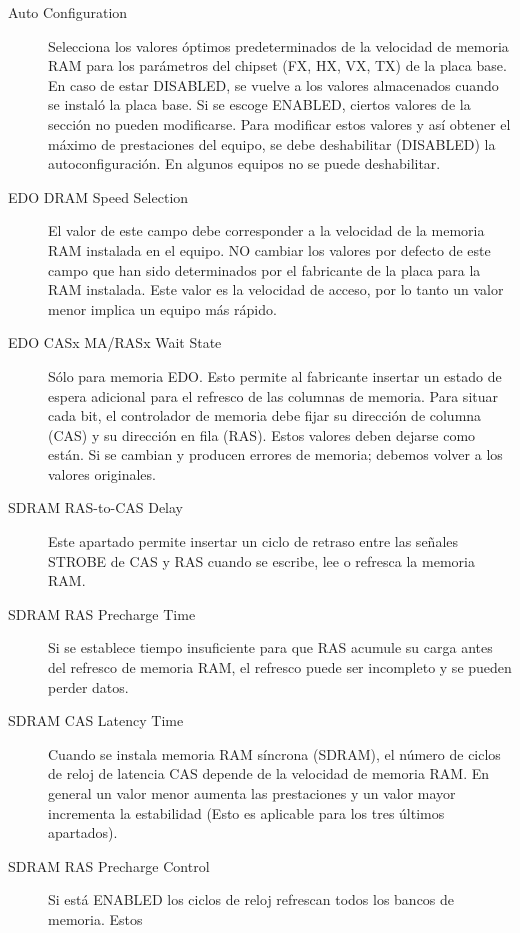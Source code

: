\documentclass[12pt,oneside,a4paper]{article}
\begin{document}
			\begin{description}
				\item[Auto Configuration] Selecciona los valores óptimos
					predeterminados de la velocidad de memoria RAM para los
					parámetros del chipset (FX, HX, VX, TX) de la placa base.
					En caso de estar DISABLED, se vuelve a los valores
					almacenados cuando se instaló la placa base. Si se escoge
					ENABLED, ciertos valores de la sección no pueden
					modificarse. Para modificar estos valores y así obtener el
					máximo de prestaciones del equipo, se debe deshabilitar
					(DISABLED) la autoconfiguración. En algunos equipos no se
					puede deshabilitar.
				\item[EDO DRAM Speed Selection] El valor de este campo debe
					corresponder a la velocidad de la memoria RAM instalada en
					el equipo. NO cambiar los valores por defecto de este campo
					que han sido determinados por el fabricante de la placa
					para la RAM instalada. Este valor es la velocidad de
					acceso, por lo tanto un valor menor implica un equipo más
					rápido.
				\item[EDO CASx MA/RASx Wait State] Sólo para memoria EDO.
					Esto permite al fabricante insertar un estado de espera
					adicional para el refresco de las columnas de memoria. Para
					situar cada bit, el controlador de memoria debe fijar su
					dirección de columna (CAS) y su dirección en fila (RAS).
					Estos valores deben dejarse como están. Si se cambian y
					producen errores de memoria; debemos volver a los valores
					originales.
				\item[SDRAM RAS-to-CAS Delay] Este apartado permite insertar un
					ciclo de retraso entre las señales STROBE de CAS y RAS
					cuando se escribe, lee o refresca la memoria RAM.
				\item[SDRAM RAS Precharge Time] Si se establece tiempo
					insuficiente para que RAS acumule su carga antes del
					refresco de memoria RAM, el refresco puede ser incompleto y
					se pueden perder datos.
				\item[SDRAM CAS Latency Time] Cuando se instala memoria RAM
					síncrona (SDRAM), el número de ciclos de reloj de latencia
					CAS depende de la velocidad de memoria RAM. En general un
					valor menor aumenta las prestaciones y un valor mayor
					incrementa la estabilidad (Esto es aplicable para los tres
					últimos apartados).
				\item[SDRAM RAS Precharge Control] Si está ENABLED los ciclos
					de reloj refrescan todos los bancos de memoria. Estos

\end{description}
\end{document}
